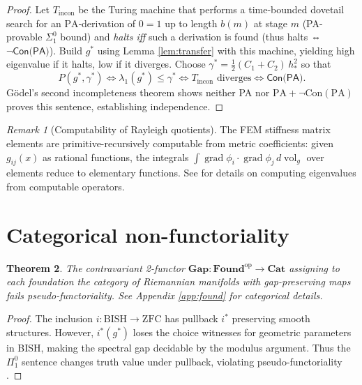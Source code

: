 \documentclass[11pt]{article}
\newtheorem{theorem}{Theorem}[section]
\theoremstyle{definition}\newtheorem{definition}[theorem]{Definition}
\theoremstyle{remark}\newtheorem{remark}[theorem]{Remark}
\newcommand{\Found}{\mathbf{Found}}
\newcommand{\Gap}{\mathbf{Gap}}
\DeclareMathOperator{\grad}{grad}
\DeclareMathOperator{\vol}{vol}
\newcommand{\Tincon}{T_{\mathrm{incon}}}      %
\begin{document}
\begin{proof}
Let $\Tincon$ be the Turing machine that performs a time-bounded dovetail search for
an $\mathrm{PA}$‑derivation of $0=1$ up to length $b(m)$ at stage $m$ (PA-provable $\Sigma^0_1$ bound) and \emph{halts iff} such a
derivation is found (thus halts ⇔ $\lnot\textsf{Con(PA)}$). Build $g^\ast$
using Lemma \ref{lem:transfer} with this machine, yielding high
eigenvalue if it halts, low if it diverges. Choose
$\gamma^\ast=\tfrac12(C_1+C_2)\,h_\ast^{2}$ so that
\[
P(g^\ast,\gamma^\ast)\iff\lambda_{1}(g^\ast)\le\gamma^\ast
\iff \Tincon\text{ diverges}\iff\textsf{Con(PA)} .
\]
Gödel's second incompleteness theorem shows neither PA nor $\mathrm{PA}+
\neg\mathrm{Con(PA)}$ proves this sentence, establishing independence.
\end{proof}

\begin{remark}[Computability of Rayleigh quotients]
The FEM stiffness matrix elements are primitive-recursively computable from metric coefficients: given $g_{ij}(x)$ as rational functions, the integrals $\int \grad\phi_i \cdot \grad\phi_j \, d\vol_g$ over elements reduce to elementary functions. See \cite[Chapter 6]{PourElRichards1989} for details on computing eigenvalues from computable operators.
\end{remark}

\section{Categorical non-functoriality}\label{sec:found}

\begin{theorem}
The contravariant 2-functor $\Gap:\Found^{\mathrm{op}}\to\mathbf{Cat}$ assigning to each foundation the category of Riemannian manifolds with gap-preserving maps fails pseudo-functoriality. See Appendix \ref{app:found} for categorical details.
\end{theorem}

\begin{proof}
The inclusion $i:\mathrm{BISH}\to\mathrm{ZFC}$ has pullback $i^*$ preserving smooth structures. However, $i^*(g^\ast)$ loses the choice witnesses for geometric parameters in BISH, making the spectral gap decidable by the modulus argument. Thus the $\Pi^0_1$ sentence changes truth value under pullback, violating pseudo-functoriality \cite{Lee2025Framework}.
\end{proof}
\end{document}
